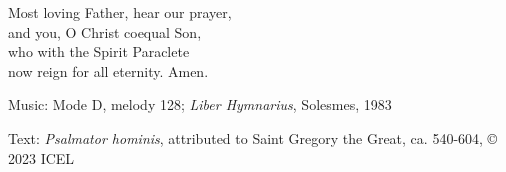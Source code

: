 \hymn



\begin{underhymnverse}
  Most loving Father, hear our prayer,\\
  and you, O Christ coequal Son,\\
  who with the Spirit Paraclete\\
  now reign for all eternity. Amen.
\end{underhymnverse}

\begin{hymnsource}
Music: Mode D, melody 128; \emph{Liber Hymnarius}, Solesmes, 1983

Text: \emph{Psalmator hominis}, attributed to Saint Gregory the Great, ca. 540-604, © 2023 ICEL
\end{hymnsource}
